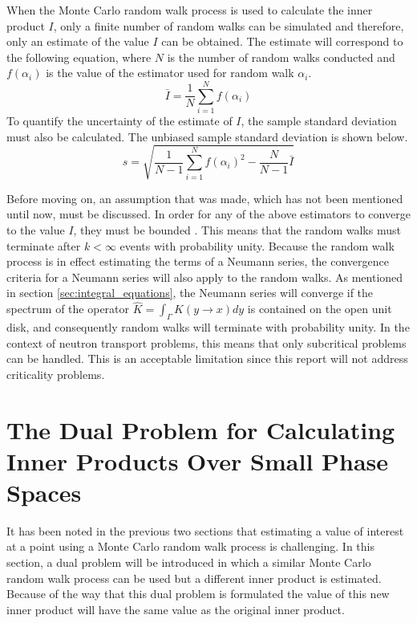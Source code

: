 When the Monte Carlo random walk process is used to calculate the inner product
$I$, only a finite number of random walks can be simulated and therefore, only 
an estimate of the value $I$ can be obtained. The estimate will
correspond to the following equation, where $N$ is the number of random walks
conducted and $f(\alpha_i)$ is the value of the estimator used for random
walk $\alpha_i$.
\begin{equation}
  \bar{I} = \frac{1}{N} \sum_{i=1}^N f(\alpha_i)
  \label{eq:inner_product_estimate}
\end{equation}
To quantify the uncertainty of the estimate of $I$, the sample standard 
deviation must also be calculated. The unbiased sample standard deviation is 
shown below.
\begin{equation}
  s = \sqrt{\frac{1}{N-1}\sum_{i=1}^N f(\alpha_i)^2 - \frac{N}{N-1}\bar{I}}
  \label{eq:inner_product_stddev}
\end{equation}

Before moving on, an assumption that was made, which has not been mentioned
until now, must be discussed. In order for any of the above estimators to 
converge to the value $I$, they must be bounded \citep{spanier_monte_1969}. This
means that the random walks must terminate after $k < \infty$ events with 
probability unity. Because the random walk process is in effect estimating the
terms of a Neumann series, the convergence criteria for a Neumann series will
also apply to the random walks. As mentioned in section 
\ref{sec:integral_equations}, the Neumann series will converge if the spectrum
of the operator $\hat{K} = \int_{\Gamma} K(y \to x)dy$ is contained on the open
unit disk, and consequently random walks will terminate with probability unity.
In the context of neutron transport problems, this means that only subcritical 
problems can be handled. This is an acceptable limitation since this report 
will not address criticality problems.

\section{The Dual Problem for Calculating Inner Products Over Small Phase 
  Spaces}
\label{sec:dual_problems}
It has been noted in the previous two sections that estimating a value of 
interest at a point using a Monte Carlo random walk process is challenging.
In this section, a dual problem will be introduced in which a similar Monte 
Carlo random walk process can be used but a different inner product is 
estimated. Because of the way that this dual problem is formulated the value of 
this new inner product will have the same value as the original inner product. 

